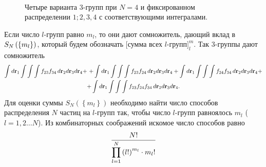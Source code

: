 \begin{figure}[h]
\begin{minipage}{0.33\linewidth}
		\caption*{$\displaystyle \int d \mathbf{r}_1 \int \int \int f_{24} f_{34} \, d \mathbf{r}_2 d \mathbf{r}_3 d \mathbf{r}_4$}
	\end{minipage} \\
	\begin{center}
	\begin{minipage}{0.33\linewidth}
		\caption*{$\displaystyle \int d \mathbf{r}_1 \int \int \int f_{23} f_{24} f_{34} \, d \mathbf{r}_2 d \mathbf{r}_3 d \mathbf{r}_4$}
	\end{minipage}
\end{center}
\caption{Четыре варианта $3$-групп при $N = 4$ и фиксированном распределении $1; 2, 3, 4$ с соответствующими интегралами.}
\end{figure}

Если число $l$-групп равно $m_l$, то они дают сомножитель, дающий вклад в $S_N \left( \left\{ m_l \right\} \right)$, который будем обозначать $\bigg[ \text{сумма всех $l$-групп} \bigg]^m_l$. Так 3-группы дают сомножитель
\vverh
\begin{gather}
\int d \mathbf{r}_1 \int \int \int f_{23} f_{34} \, d \mathbf{r}_2 d \mathbf{r}_3 d \mathbf{r}_4 + $ $+ \displaystyle \int d \mathbf{r}_1 \int \int \int f_{23} f_{24} \, d \mathbf{r}_2 d \mathbf{r}_3 d \mathbf{r}_4 + \int d \mathbf{r}_1 \int \int \int f_{24} f_{34} \, d \mathbf{r}_2 d \mathbf{r}_3 d \mathbf{r}_4 + \notag \\ + \int d \mathbf{r}_1 \int \int \int f_{23} f_{24} f_{34} \, d \mathbf{r}_2 d \mathbf{r}_3 d \mathbf{r}_4. \notag
\end{gather}
Для оценки суммы $S_N \left( \left\{ m_l \right\} \right)$ необходимо найти число способов распределения $N$ частиц на $l$-групп так, чтобы число $l$-групп равноялось $m_l$ ($l = 1, 2 \dots N$). Из комбинаторных соображений искомое число способов равно
\vverh
\begin{gather}
	\dfrac{N!}{\displaystyle\prod_{l=1}^{N} \left( l! \right)^{m_l} \cdot m_l !} \notag 
\end{gather}

